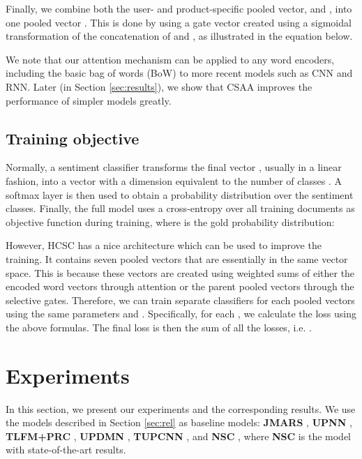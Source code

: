 \documentclass[11pt,a4paper]{article}
\begin{document}
Finally, we combine both the user- and product-specific pooled vector,  and , into one pooled vector . This is done by using a gate vector  created using a sigmoidal transformation of the concatenation of  and , as illustrated in the equation below.


We note that our attention mechanism can be applied to any word encoders, including the basic bag of words (BoW) to more recent models such as CNN and RNN. Later (in Section \ref{sec:results}), we show that CSAA improves the performance of simpler models greatly.

\subsection{Training objective}

Normally, a sentiment classifier transforms the final vector , usually in a linear fashion, into a vector with a dimension equivalent to the number of classes . A softmax layer is then used to obtain a probability distribution  over the sentiment classes. Finally, the full model uses a cross-entropy over all training documents  as objective function  during training, where  is the gold probability distribution:


However, HCSC has a nice architecture which can be used to improve the training.
It contains seven pooled vectors  that are essentially in the same vector space. This is because these vectors are created using weighted sums of either the encoded word vectors through attention or the parent pooled vectors through the selective gates. Therefore, we can train separate classifiers for each pooled vectors using the same parameters  and . Specifically, for each , we calculate the loss  using the above formulas. The final loss is then the sum of all the losses, i.e. .

\section{Experiments}

In this section, we present our experiments and the corresponding results. We use the models described in Section \ref{sec:rel} as baseline models: \textbf{JMARS} \cite{diao2014jointly}, \textbf{UPNN} \cite{tang2015learning}, \textbf{TLFM+PRC} \cite{song2017recommendation}, \textbf{UPDMN} \cite{dou2017capturing}, \textbf{TUPCNN} \cite{chen2016learning}, and \textbf{NSC} \cite{chen2016neural}, where \textbf{NSC} is the model with state-of-the-art results.
\end{document}
